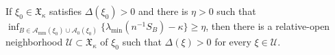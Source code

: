 If \(\xi_0\in\mathfrak X_\kappa\) satisfies \(\Delta(\xi_0)>0\) and there is \(\eta>0\) such that \(\inf_{B\in\mathcal A_{\mathrm{mm}}(\xi_0)\cup\mathcal A_0(\xi_0)}\{\lambda_{\min}(n^{-1}S_B)-\kappa\}\ge\eta\), then there is a relative-open neighborhood \(\mathcal U\subset\mathfrak X_\kappa\) of \(\xi_0\) such that \(\Delta(\xi)>0\) for every \(\xi\in\mathcal U\).